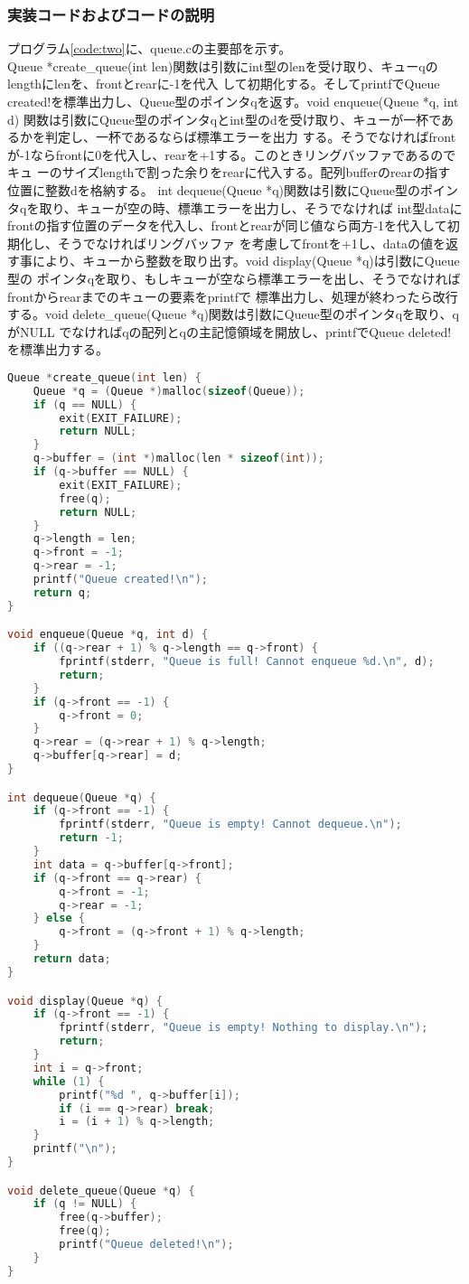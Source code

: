 \documentclass{ltjsarticle}
\begin{document}
\subsubsection{実装コードおよびコードの説明}\label{subsubsec:実装コードおよびコードの説明2}
プログラム\ref{code:two}に、queue.cの主要部を示す。\\ \indent
Queue *create\_queue(int len)関数は引数にint型のlenを受け取り、キューqのlengthにlenを、frontとrearに-1を代入
して初期化する。そしてprintfでQueue created!を標準出力し、Queue型のポインタqを返す。void enqueue(Queue *q, int d)
関数は引数にQueue型のポインタqとint型のdを受け取り、キューが一杯であるかを判定し、一杯であるならば標準エラーを出力
する。そうでなければfrontが-1ならfrontに0を代入し、rearを+1する。このときリングバッファであるのでキュ
ーのサイズlengthで割った余りをrearに代入する。配列bufferのrearの指す位置に整数dを格納する。
int dequeue(Queue *q)関数は引数にQueue型のポインタqを取り、キューが空の時、標準エラーを出力し、そうでなければ
int型dataにfrontの指す位置のデータを代入し、frontとrearが同じ値なら両方-1を代入して初期化し、そうでなければリングバッファ
を考慮してfrontを+1し、dataの値を返す事により、キューから整数を取り出す。void display(Queue *q)は引数にQueue型の
ポインタqを取り、もしキューが空なら標準エラーを出し、そうでなければfrontからrearまでのキューの要素をprintfで
標準出力し、処理が終わったら改行する。void delete\_queue(Queue *q)関数は引数にQueue型のポインタqを取り、qがNULL
でなければqの配列とqの主記憶領域を開放し、printfでQueue deleted!を標準出力する。
\begin{lstlisting}[caption=queue.cの主要部, label=code:two, language=C,captionpos = b]
Queue *create_queue(int len) {
    Queue *q = (Queue *)malloc(sizeof(Queue));
    if (q == NULL) {
        exit(EXIT_FAILURE);
        return NULL;
    }
    q->buffer = (int *)malloc(len * sizeof(int));
    if (q->buffer == NULL) {
        exit(EXIT_FAILURE);
        free(q);
        return NULL;
    }
    q->length = len;
    q->front = -1;
    q->rear = -1;
    printf("Queue created!\n");
    return q;
}

void enqueue(Queue *q, int d) {
    if ((q->rear + 1) % q->length == q->front) {
        fprintf(stderr, "Queue is full! Cannot enqueue %d.\n", d);
        return;
    }
    if (q->front == -1) {
        q->front = 0;
    }
    q->rear = (q->rear + 1) % q->length;
    q->buffer[q->rear] = d;
}

int dequeue(Queue *q) {
    if (q->front == -1) {
        fprintf(stderr, "Queue is empty! Cannot dequeue.\n");
        return -1;
    }
    int data = q->buffer[q->front];
    if (q->front == q->rear) {
        q->front = -1;
        q->rear = -1;
    } else {
        q->front = (q->front + 1) % q->length;
    }
    return data;
}

void display(Queue *q) {
    if (q->front == -1) {
        fprintf(stderr, "Queue is empty! Nothing to display.\n");
        return;
    }
    int i = q->front;
    while (1) {
        printf("%d ", q->buffer[i]);
        if (i == q->rear) break;
        i = (i + 1) % q->length;
    }
    printf("\n");
}

void delete_queue(Queue *q) {
    if (q != NULL) {
        free(q->buffer);
        free(q);
        printf("Queue deleted!\n");
    }
} 
\end{lstlisting}
\end{document}
